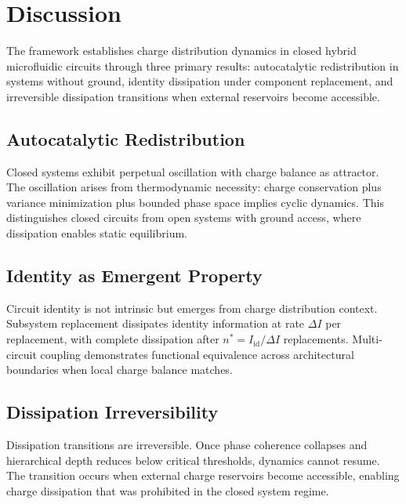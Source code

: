 \documentclass[12pt,a4paper]{article}
\theoremstyle{plain}
\theoremstyle{definition}
\theoremstyle{remark}
\begin{document}









\section{Discussion}
\label{sec:discussion}

The framework establishes charge distribution dynamics in closed hybrid microfluidic circuits through three primary results: autocatalytic redistribution in systems without ground, identity dissipation under component replacement, and irreversible dissipation transitions when external reservoirs become accessible.

\subsection{Autocatalytic Redistribution}

Closed systems exhibit perpetual oscillation with charge balance as attractor. The oscillation arises from thermodynamic necessity: charge conservation plus variance minimization plus bounded phase space implies cyclic dynamics. This distinguishes closed circuits from open systems with ground access, where dissipation enables static equilibrium.

\subsection{Identity as Emergent Property}

Circuit identity is not intrinsic but emerges from charge distribution context. Subsystem replacement dissipates identity information at rate $\Delta I$ per replacement, with complete dissipation after $n^* = I_{\text{id}} / \Delta I$ replacements. Multi-circuit coupling demonstrates functional equivalence across architectural boundaries when local charge balance matches.

\subsection{Dissipation Irreversibility}

Dissipation transitions are irreversible. Once phase coherence collapses and hierarchical depth reduces below critical thresholds, dynamics cannot resume. The transition occurs when external charge reservoirs become accessible, enabling charge dissipation that was prohibited in the closed system regime.
\end{document}
